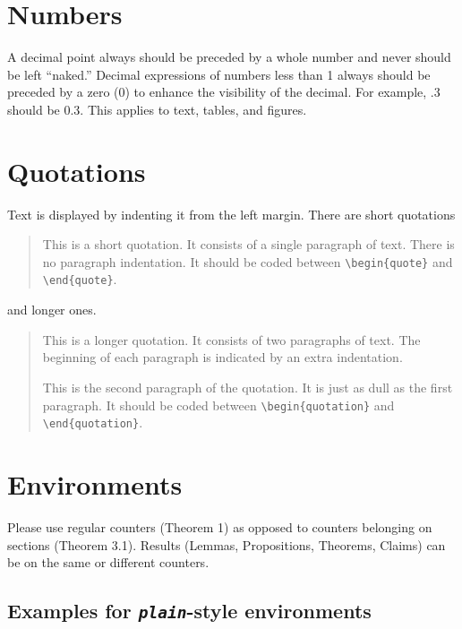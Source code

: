 \documentclass[qe,nameyear,final,supplement,openaccess]{econsocart}
\theoremstyle{plain}
\begin{document}
\section{Numbers}

A decimal point always should be preceded by a whole number and never should be left ``naked.'' Decimal expressions of numbers less than 1 always should be preceded by a zero (0) to enhance the visibility of the decimal. For example, .3 should be 0.3. This applies to text, tables, and figures.

\section{Quotations}

Text is displayed by indenting it from the left margin. There are short quotations

\begin{quote}
This is a short quotation. It consists of a
single paragraph of text. There is no paragraph
indentation. It should be coded between \texttt{{\textbackslash}begin\{quote\}} and \texttt{{\textbackslash}end\{quote\}}.
\end{quote}

and longer ones.

\begin{quote}
This is a longer quotation. It consists of two paragraphs
of text. The beginning of each paragraph is indicated
by an extra indentation.

This is the second paragraph of the quotation. It is just
as dull as the first paragraph. It should be coded between \texttt{{\textbackslash}begin\{quotation\}} and \texttt{{\textbackslash}end\{quotation\}}.
\end{quote}

\section{Environments}

Please use regular counters (Theorem 1) as opposed to counters belonging on sections (Theorem 3.1). Results (Lemmas, Propositions, Theorems, Claims) can be on the same or different counters.

\subsection{Examples for \textit{\texttt{plain}}-style environments}
\end{document}
